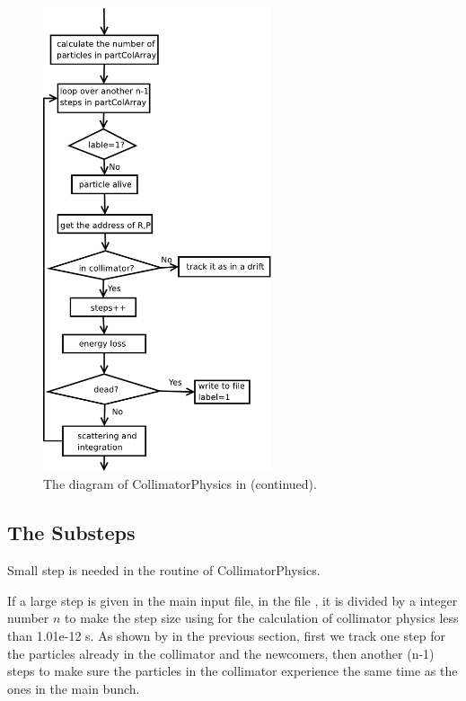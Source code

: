 \begin{figure}[h!]
\begin{center}
\includegraphics[width=0.6\textwidth]{figures/partmatter/Diagram2}
\end{center}
\caption{The diagram of CollimatorPhysics in \opal (continued). }
\label{fig:diagram2}
\end{figure}
\clearpage

\subsection{The Substeps}

Small step is needed in the routine of CollimatorPhysics.

If a large step is given in the main input file, in the file ,
it is divided by a integer number $n$ to make the step size using for the calculation of collimator physics less than 1.01e-12 s. As shown
by   in the previous section, first we track one step for the particles already in the
collimator and the newcomers, then another (n-1) steps to make sure the particles in the collimator experience the same time as the ones
in the main bunch.


